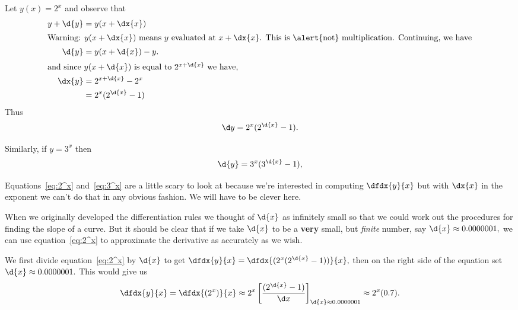 Let $y(x)=2^x$ and observe that 
\begin{align*}
  y+\d{y}&=y(x+\dx{x})\\
  \intertext{Warning: $y(x+\dx{x})$ means $y$ evaluated at
  $x+\dx{x}$. This is \alert{not} multiplication. Continuing, we have}
  \d{y}&=y(x+\d{x})-y. \\
\intertext{and since $y(x+\d{x})$ is equal to $2^{x+\d{x}}$ we
  have,}
      \dx{y} &=2^{x+\d{x}}-2^x\\
       &=2^x(2^{\d{x}}-1)
\end{align*}
Thus
\begin{equation}
  \d y =2^x(2^{\d{x}}-1).  \label{eq:2^x}
\end{equation}

Similarly, if $y=3^x$ then
\begin{equation}
  \d{y} = 3^x(3^{\d{x}}-1),\label{eq:3^x}
\end{equation}

Equations~\ref{eq:2^x} and~\ref{eq:3^x} are a little scary to look
at because we're interested in computing $\dfdx{y}{x}$ but
with $\dx{x}$ in the exponent we can't do that in any obvious
fashion. We will have to be clever here.

When we originally developed the differentiation rules we thought of
$\d{x}$ as infinitely small so that we
could work out the procedures for finding the slope of a curve. But it
should be clear that if we take $\d{x}$ to be a {\bf{}very} small, but
\emph{finite} number, say $\d{x}\approx 0.0000001,$ we can use
equation~\ref{eq:2^x} to approximate the derivative as accurately as
we wish.

We first divide equation~\ref{eq:2^x} by $\d{x}${} to
get $ \dfdx{y}{x} =\dfdx{(2^x(2^{\d{x}}-1))}{x},$ then on the right
side of the equation set
$\d{x}\approx 0.0000001.$ This would give us
\begin{equation}
  \dfdx{y}{x}=\dfdx{(2^x)}{x}\approx 2^x\left[\frac{(2^{\d{x}}-1)}{\d
      x}\right]_{\d{x}\approx0.0000001} \approx
  2^x(0.7).\label{eq:Exp2}
\end{equation}

